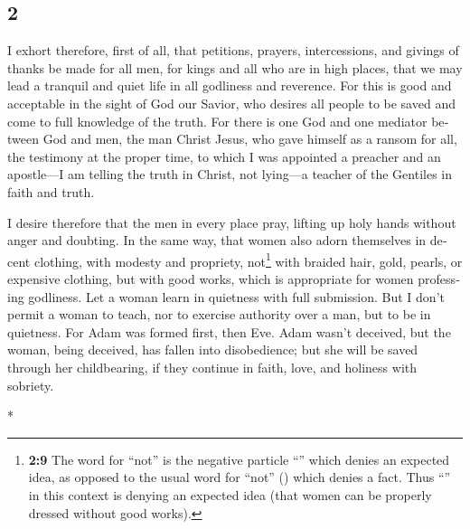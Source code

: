 \begin{paracol}{2}
\switchcolumn
\begin{otherlanguage}{english}

\hypertarget{section-3}{%
\section{2}\label{section-3}}

 I exhort therefore, first of all, that petitions,
prayers, intercessions, and givings of thanks be made for all men,
 for kings and all who are in high places, that we may
lead a tranquil and quiet life in all godliness and reverence.
 For this is good and acceptable in the sight of God our
Savior,  who desires all people to be saved and come to
full knowledge of the truth.  For there is one God and one
mediator between God and men, the man Christ Jesus,  who
gave himself as a ransom for all, the testimony at the proper time,
 to which I was appointed a preacher and an apostle---I am
telling the truth in Christ, not lying---a teacher of the Gentiles in
faith and truth.

 I desire therefore that the men in every place pray,
lifting up holy hands without anger and doubting.  In the
same way, that women also adorn themselves in decent clothing, with
modesty and propriety, not\footnote{\textbf{2:9} The word for ``not'' is
  the negative particle ``'' which denies an expected idea, as
  opposed to the usual word for ``not'' () which denies a
  fact. Thus ``'' in this context is denying an expected idea
  (that women can be properly dressed without good works).} with braided
hair, gold, pearls, or expensive clothing,  but with good
works, which is appropriate for women professing godliness.
 Let a woman learn in quietness with full submission.
 But I don't permit a woman to teach, nor to exercise
authority over a man, but to be in quietness.  For Adam
was formed first, then Eve.  Adam wasn't deceived, but
the woman, being deceived, has fallen into disobedience; 
but she will be saved through her childbearing, if they continue in
faith, love, and holiness with sobriety.

\end{otherlanguage}

\switchcolumn[0]*

\hypertarget{requisitos-para-el-cargo-de-jefe}{%
}
\end{paracol}
